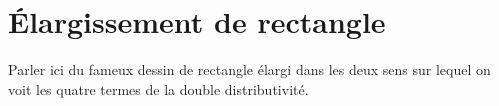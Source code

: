 \section{Élargissement de rectangle}

Parler ici du fameux dessin de rectangle élargi dans les deux sens sur lequel on voit les quatre termes de la double distributivité.


